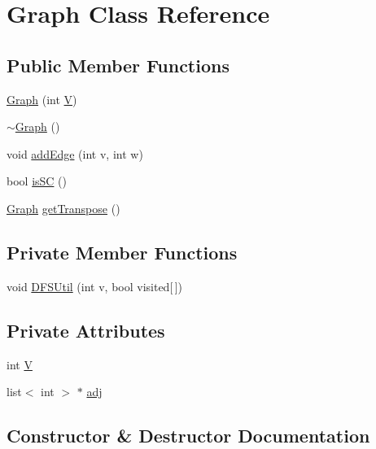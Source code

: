 \hypertarget{classGraph}{}\section{Graph Class Reference}
\label{classGraph}
\subsection*{Public Member Functions}
\begin{DoxyCompactItemize}
\item 
\hyperlink{classGraph_af3ff6b295df8bf3bee0bafd7c7d56915}{Graph} (int \hyperlink{classGraph_a2b722f7cfa7a21e4cb5fae488b3d4dcc}{V})
\item 
\hyperlink{classGraph_a902c5b3eacb66d60752525ab23297a95}{$\sim$\+Graph} ()
\item 
void \hyperlink{classGraph_a8a3b5afce00f9d260b01c188fbe73f53}{add\+Edge} (int v, int w)
\item 
bool \hyperlink{classGraph_af761afe9665b65f11beb2a604fd1a326}{is\+SC} ()
\item 
\hyperlink{classGraph}{Graph} \hyperlink{classGraph_abdaf0cb08811d4b30f4c85f632e0e181}{get\+Transpose} ()
\end{DoxyCompactItemize}
\subsection*{Private Member Functions}
\begin{DoxyCompactItemize}
\item 
void \hyperlink{classGraph_a47d02784c897a7e0d42a29c698161648}{D\+F\+S\+Util} (int v, bool visited\mbox{[}$\,$\mbox{]})
\end{DoxyCompactItemize}
\subsection*{Private Attributes}
\begin{DoxyCompactItemize}
\item 
int \hyperlink{classGraph_a2b722f7cfa7a21e4cb5fae488b3d4dcc}{V}
\item 
list$<$ int $>$ $\ast$ \hyperlink{classGraph_a04ab9c17ad31aa036def8db0f88b035b}{adj}
\end{DoxyCompactItemize}


\subsection{Constructor \& Destructor Documentation}
